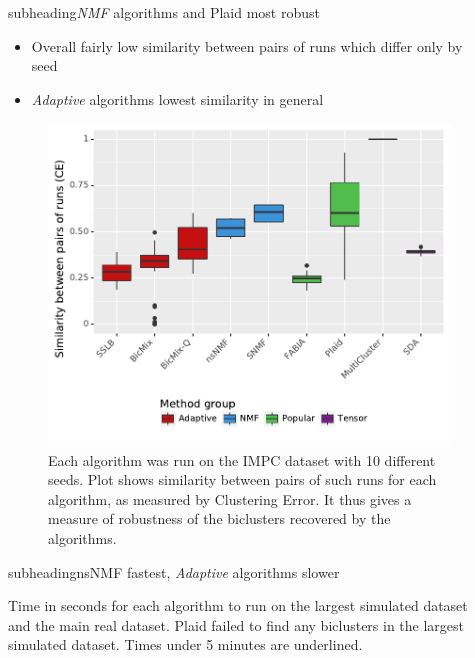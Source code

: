 \documentclass[xcolor=table,final]{beamer}
\newlength{\onecolwid}
\newlength{\twocolwid}
\newcommand{\kcnsubheading}[1]{\begin{beamercolorbox}[rounded=true]{subheading}{\large #1}\end{beamercolorbox}}
\begin{document}
\begin{frame}[t]
\begin{columns}[t]
\begin{column}{\twocolwid}
\begin{columns}
\begin{column}{\onecolwid}
\end{column} %

\begin{column}{\onecolwid} %

\kcnsubheading{\textit{NMF} algorithms and Plaid most robust}

\begin{itemize}
    \item Overall fairly low similarity between pairs of runs which differ only by seed
    \item \textit{Adaptive} algorithms lowest similarity in general
\end{itemize}

\begin{figure}
\includegraphics[width=0.9 \textwidth]{plots/similarity_methods_K.pdf}
\caption{Each algorithm was run on the IMPC dataset with 10 different seeds. Plot shows similarity between pairs of such runs for each algorithm, as measured by Clustering Error. It thus gives a measure of robustness of the biclusters recovered by the algorithms.}
\end{figure}

\kcnsubheading{nsNMF fastest, \textit{Adaptive} algorithms slower}

\begin{table}[t!]
\caption{Time in seconds for each algorithm to run on the largest simulated dataset and the main real dataset. Plaid failed to find any biclusters in the largest simulated dataset. Times under 5 minutes are underlined.}


\end{table}
\end{column}
\end{columns}
\end{column}
\end{columns}
\end{frame}
\end{document}
